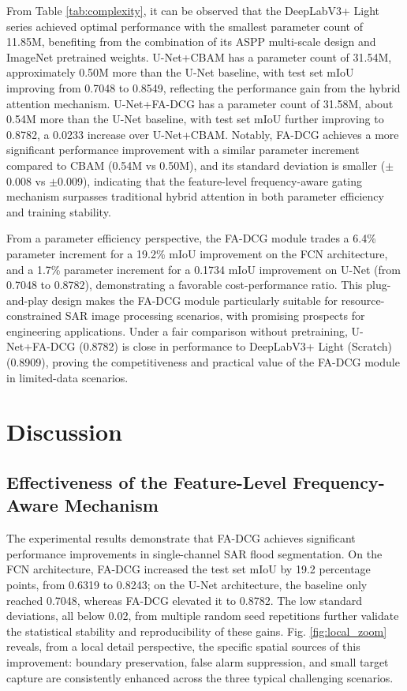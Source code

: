 \documentclass[lettersize,journal]{IEEEtran}
\begin{document}
From Table \ref{tab:complexity}, it can be observed that the DeepLabV3+ Light series achieved optimal performance with the smallest parameter count of 11.85M, benefiting from the combination of its ASPP multi-scale design and ImageNet pretrained weights. U-Net+CBAM has a parameter count of 31.54M, approximately 0.50M more than the U-Net baseline, with test set mIoU improving from 0.7048 to 0.8549, reflecting the performance gain from the hybrid attention mechanism. U-Net+FA-DCG has a parameter count of 31.58M, about 0.54M more than the U-Net baseline, with test set mIoU further improving to 0.8782, a 0.0233 increase over U-Net+CBAM. Notably, FA-DCG achieves a more significant performance improvement with a similar parameter increment compared to CBAM (0.54M vs 0.50M), and its standard deviation is smaller ($\pm$0.008 vs $\pm$0.009), indicating that the feature-level frequency-aware gating mechanism surpasses traditional hybrid attention in both parameter efficiency and training stability.

From a parameter efficiency perspective, the FA-DCG module trades a 6.4\% parameter increment for a 19.2\% mIoU improvement on the FCN architecture, and a 1.7\% parameter increment for a 0.1734 mIoU improvement on U-Net (from 0.7048 to 0.8782), demonstrating a favorable cost-performance ratio. This plug-and-play design makes the FA-DCG module particularly suitable for resource-constrained SAR image processing scenarios, with promising prospects for engineering applications. Under a fair comparison without pretraining, U-Net+FA-DCG (0.8782) is close in performance to DeepLabV3+ Light (Scratch) (0.8909), proving the competitiveness and practical value of the FA-DCG module in limited-data scenarios.


\section{Discussion}

\subsection{Effectiveness of the Feature-Level Frequency-Aware Mechanism}

The experimental results demonstrate that FA-DCG achieves significant performance improvements in single-channel SAR flood segmentation. On the FCN architecture, FA-DCG increased the test set mIoU by 19.2 percentage points, from 0.6319 to 0.8243; on the U-Net architecture, the baseline only reached 0.7048, whereas FA-DCG elevated it to 0.8782. The low standard deviations, all below 0.02, from multiple random seed repetitions further validate the statistical stability and reproducibility of these gains. Fig. \ref{fig:local_zoom} reveals, from a local detail perspective, the specific spatial sources of this improvement: boundary preservation, false alarm suppression, and small target capture are consistently enhanced across the three typical challenging scenarios.
\end{document}
